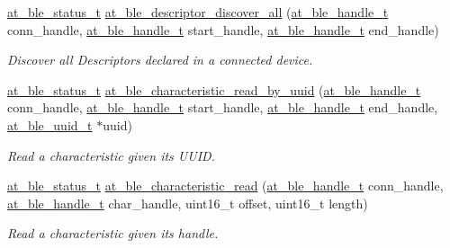\begin{DoxyCompactItemize}
\mbox{\hyperlink{group__error__codes__group_ga3b1db9b95feb157b3c188ca27fe76988}{at\+\_\+ble\+\_\+status\+\_\+t}} \mbox{\hyperlink{group__gatt__client__group_gabc3b59303cef6377ee364c7be4f27bb8}{at\+\_\+ble\+\_\+descriptor\+\_\+discover\+\_\+all}} (\mbox{\hyperlink{at__ble__api_8h_abd23646d0c662860741f787efc8456f2}{at\+\_\+ble\+\_\+handle\+\_\+t}} conn\+\_\+handle, \mbox{\hyperlink{at__ble__api_8h_abd23646d0c662860741f787efc8456f2}{at\+\_\+ble\+\_\+handle\+\_\+t}} start\+\_\+handle, \mbox{\hyperlink{at__ble__api_8h_abd23646d0c662860741f787efc8456f2}{at\+\_\+ble\+\_\+handle\+\_\+t}} end\+\_\+handle)
\begin{DoxyCompactList}\small\item\em Discover all Descriptors declared in a connected device. \end{DoxyCompactList}\item 
\mbox{\hyperlink{group__error__codes__group_ga3b1db9b95feb157b3c188ca27fe76988}{at\+\_\+ble\+\_\+status\+\_\+t}} \mbox{\hyperlink{group__gatt__client__group_gad285cc2e31fbacc50d11a1c0ff6eb9e4}{at\+\_\+ble\+\_\+characteristic\+\_\+read\+\_\+by\+\_\+uuid}} (\mbox{\hyperlink{at__ble__api_8h_abd23646d0c662860741f787efc8456f2}{at\+\_\+ble\+\_\+handle\+\_\+t}} conn\+\_\+handle, \mbox{\hyperlink{at__ble__api_8h_abd23646d0c662860741f787efc8456f2}{at\+\_\+ble\+\_\+handle\+\_\+t}} start\+\_\+handle, \mbox{\hyperlink{at__ble__api_8h_abd23646d0c662860741f787efc8456f2}{at\+\_\+ble\+\_\+handle\+\_\+t}} end\+\_\+handle, \mbox{\hyperlink{structat__ble__uuid__t}{at\+\_\+ble\+\_\+uuid\+\_\+t}} $\ast$uuid)
\begin{DoxyCompactList}\small\item\em Read a characteristic given its U\+U\+ID. \end{DoxyCompactList}\item 
\mbox{\hyperlink{group__error__codes__group_ga3b1db9b95feb157b3c188ca27fe76988}{at\+\_\+ble\+\_\+status\+\_\+t}} \mbox{\hyperlink{group__gatt__client__group_gabae315596f9e0b85a5f4f1df0b5bf78d}{at\+\_\+ble\+\_\+characteristic\+\_\+read}} (\mbox{\hyperlink{at__ble__api_8h_abd23646d0c662860741f787efc8456f2}{at\+\_\+ble\+\_\+handle\+\_\+t}} conn\+\_\+handle, \mbox{\hyperlink{at__ble__api_8h_abd23646d0c662860741f787efc8456f2}{at\+\_\+ble\+\_\+handle\+\_\+t}} char\+\_\+handle, uint16\+\_\+t offset, uint16\+\_\+t length)
\begin{DoxyCompactList}\small\item\em Read a characteristic given its handle. \end{DoxyCompactList}\item 

\end{DoxyCompactItemize}
